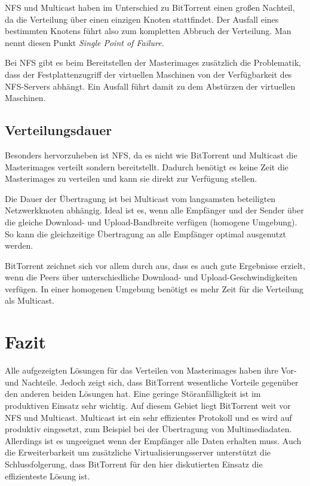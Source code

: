 NFS und Multicast haben im Unterschied zu BitTorrent einen großen Nachteil, da die Verteilung über einen einzigen Knoten stattfindet. Der Ausfall eines bestimmten Knotens führt also zum kompletten Abbruch der Verteilung. Man nennt diesen Punkt \textit{Single Point of Failure}. 

Bei NFS gibt es beim Bereitstellen der Masterimages zusätzlich die Problematik, dass der Festplattenzugriff der virtuellen Maschinen von der Verfügbarkeit des NFS-Servers abhängt. Ein Ausfall führt damit zu dem Abstürzen der virtuellen Maschinen.


\subsection{Verteilungsdauer}
Besonders hervorzuheben ist NFS, da es nicht wie BitTorrent und Multicast die Masterimages verteilt sondern bereitstellt. Dadurch benötigt es keine Zeit die Masterimages zu verteilen und kann sie direkt zur Verfügung stellen. 

Die Dauer der Übertragung ist bei Multicast vom langsamsten beteiligten Netzwerkknoten abhängig. Ideal ist es, wenn alle Empfänger und der Sender über die gleiche Download- und Upload-Bandbreite verfügen (homogene Umgebung). So kann die gleichzeitige Übertragung an alle Empfänger optimal ausgenutzt werden.

BitTorrent zeichnet sich vor allem durch aus, dass es auch gute Ergebnisse erzielt, wenn die Peers über unterschiedliche Download- und Upload-Geschwindigkeiten verfügen. In einer homogenen Umgebung benötigt es mehr Zeit für die Verteilung als Multicast. 

\section{Fazit}

Alle aufgezeigten Lösungen für das Verteilen von Masterimages haben ihre Vor- und Nachteile. Jedoch zeigt sich, dass BitTorrent wesentliche Vorteile gegenüber den anderen beiden Lösungen hat. Eine geringe Störanfälligkeit ist im produktiven Einsatz sehr wichtig. Auf diesem Gebiet liegt BitTorrent weit vor NFS und Multicast. Multicast ist ein sehr effizientes Protokoll und es wird auf produktiv eingesetzt, zum Beispiel bei der Übertragung von Multimediadaten. Allerdings ist es ungeeignet wenn der Empfänger alle Daten erhalten muss. Auch die Erweiterbarkeit um zusätzliche Virtualisierungsserver unterstützt die Schlussfolgerung, dass BitTorrent für den hier diskutierten Einsatz die effizienteste Lösung ist.